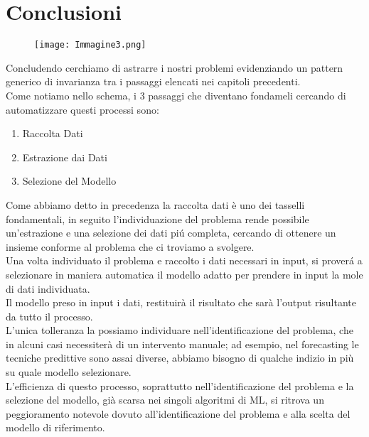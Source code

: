 \documentclass[../tesi.tex]{subfiles}
\begin{document}
\section{Conclusioni}
\begin{figure}[htbp]
  \centering
  \texttt{[image: Immagine3.png]} 
  \end{figure}
Concludendo cerchiamo di astrarre i nostri problemi evidenziando un pattern generico di invarianza tra i passaggi elencati nei capitoli precedenti.\\
Come notiamo nello schema, i 3 passaggi che diventano fondameli cercando di automatizzare questi processi sono:
\begin{enumerate}
  \item Raccolta Dati
  \item Estrazione dai Dati 
  \item Selezione del Modello
\end{enumerate}
Come abbiamo detto in precedenza la raccolta dati è uno dei tasselli fondamentali, in seguito l’individuazione del problema rende possibile un'estrazione e una selezione dei dati piú completa, cercando di ottenere un insieme conforme al problema che ci troviamo a svolgere.\\
Una volta individuato il problema e raccolto i dati necessari in input, si proverá a selezionare in maniera automatica il modello adatto per prendere in input la mole di dati individuata.\\
Il modello preso in input i dati, restituirà il risultato che sarà l’output risultante da tutto il processo.\\
L’unica tolleranza la possiamo individuare nell’identificazione del problema, che in alcuni casi necessiterà di un intervento manuale; ad esempio, nel forecasting le tecniche predittive sono assai diverse, abbiamo bisogno di qualche indizio in più su quale modello selezionare.\\
L’efficienza di questo processo, soprattutto nell’identificazione del problema e la selezione del modello, già scarsa nei singoli algoritmi di ML, si ritrova un peggioramento notevole dovuto all’identificazione del problema e alla scelta del modello di riferimento.
\end{document}
